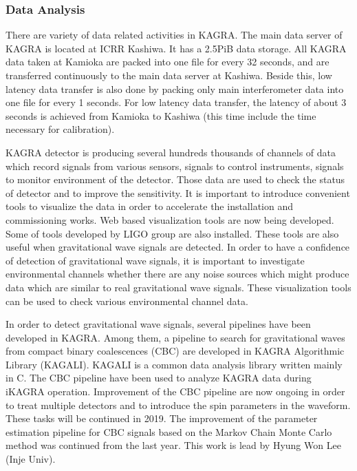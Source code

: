 \vspace{10pt}
\subsubsection*{\bf Data Analysis}
\vspace{3pt}

\vspace{3pt}

\vspace{3pt}
There are variety of data related activities in KAGRA. 
The main data server of KAGRA is located at ICRR Kashiwa. It has a 2.5PiB data storage. 
All KAGRA data taken at Kamioka are packed into one file for every 32 seconds, 
and are transferred continuously to the main data server at Kashiwa. Beside this, low latency data transfer 
is also done by packing only main interferometer data into one file for every 1 seconds. 
For low latency data transfer, the latency of about 3 seconds is achieved from Kamioka to Kashiwa
(this time include the time necessary for calibration). 

KAGRA detector is producing several hundreds thousands of channels of data which record 
signals from various sensors, signals to control instruments, signals to monitor environment of the detector. 
Those data are used to check the status of detector and to improve the sensitivity. 
It is important to introduce convenient tools to visualize the data in order to accelerate the installation 
and commissioning works.  
Web based visualization tools are now being developed. Some of tools developed by LIGO group are also installed. 
These tools are also useful when gravitational wave signals are detected. 
In order to have a confidence of detection of gravitational wave signals, 
it is important to investigate environmental channels whether there are any noise sources which might 
produce data which are similar to real gravitational wave signals. 
These visualization tools can be used to check various  environmental channel data. 


In order to detect gravitational wave signals, several pipelines have been developed in KAGRA. 
Among them, a pipeline to search for gravitational waves from compact binary coalescences (CBC) 
are developed in KAGRA Algorithmic Library (KAGALI). KAGALI is a common data analysis library 
written mainly in C. The CBC pipeline have been used to analyze KAGRA data during iKAGRA operation. 
Improvement of the CBC pipeline are now ongoing in order to treat multiple detectors and 
to introduce the spin parameters in the waveform. These tasks will be continued in 2019. 
The improvement of the parameter estimation pipeline for CBC signals 
based on the Markov Chain Monte Carlo method was continued from the last year. 
This work is lead by Hyung Won Lee (Inje Univ). 

